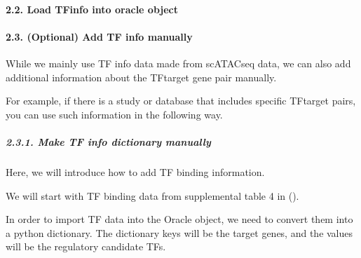 \documentclass[letterpaper,10pt,english]{sphinxmanual}
\begin{document}
\paragraph{2.2. Load TFinfo into oracle object}
\label{\detokenize{notebooks/04_Network_analysis/Network_analysis_with_Paul_etal_2015_data:2.2.-Load-TFinfo-into-oracle-object}}
{
\begin{sphinxVerbatim}[commandchars=\\\{\}]
\llap{\color{nbsphinxin}[13]:\,\hspace{\fboxrule}\hspace{\fboxsep}}

\end{sphinxVerbatim}
}


\paragraph{2.3. (Optional) Add TF info manually}
\label{\detokenize{notebooks/04_Network_analysis/Network_analysis_with_Paul_etal_2015_data:2.3.-(Optional)-Add-TF-info-manually}}
While we mainly use TF info data made from scATAC\sphinxhyphen{}seq data, we can also add additional information about the TF\sphinxhyphen{}target gene pair manually.

For example, if there is a study or database that includes specific TF\sphinxhyphen{}target pairs, you can use such information in the following way.


\subparagraph{2.3.1. Make TF info dictionary manually}
\label{\detokenize{notebooks/04_Network_analysis/Network_analysis_with_Paul_etal_2015_data:2.3.1.-Make-TF-info-dictionary-manually}}
Here, we will introduce how to add TF binding information.

We will start with TF binding data from supplemental table 4 in ().

In order to import TF data into the Oracle object, we need to convert them into a python dictionary. The dictionary keys will be the target genes, and the values will be the regulatory candidate TFs.
\end{document}
